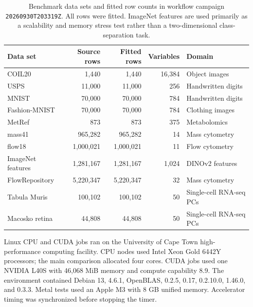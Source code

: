 \documentclass[article]{jss}
\begin{document}
\begin{table}[t]
\centering
\caption{Benchmark data sets and fitted row counts in workflow campaign
  \texttt{20260930T203319Z}. All rows were fitted. ImageNet features are
  used primarily as a
  scalability and memory stress test rather than a two-dimensional
  class-separation task.}
\label{tab:data}
\scriptsize
\begin{tabular}{lrrrl}
\toprule
Data set & Source rows & Fitted rows & Variables & Domain \\
\midrule
COIL20 & 1,440 & 1,440 & 16,384 & Object images \\
USPS & 11,000 & 11,000 & 256 & Handwritten digits \\
MNIST & 70,000 & 70,000 & 784 & Handwritten digits \\
Fashion-MNIST & 70,000 & 70,000 & 784 & Clothing images \\
MetRef & 873 & 873 & 375 & Metabolomics \\
mass41 & 965,282 & 965,282 & 14 & Mass cytometry \\
flow18 & 1,000,021 & 1,000,021 & 11 & Flow cytometry \\
ImageNet features & 1,281,167 & 1,281,167 & 1,024 & DINOv2 features \\
FlowRepository & 5,220,347 & 5,220,347 & 32 & Mass cytometry \\
Tabula Muris & 100,102 & 100,102 & 50 & Single-cell RNA-seq PCs \\
Macosko retina & 44,808 & 44,808 & 50 & Single-cell RNA-seq PCs \\
\bottomrule
\end{tabular}
\end{table}

Linux CPU and CUDA jobs ran on the University of Cape Town high-performance
computing facility. CPU nodes used Intel Xeon Gold 6442Y processors; the main
comparison allocated four cores. CUDA jobs used one NVIDIA L40S with 46,068
MiB memory and compute capability 8.9. The environment contained Debian 13,
 4.6.1, OpenBLAS,  0.2.5,  0.17,
 0.2.10.0,  1.46.0, and  0.3.3. Metal
tests used an Apple M3 with 8 GB unified memory. Accelerator timing was
synchronized before stopping the timer.
\end{document}
